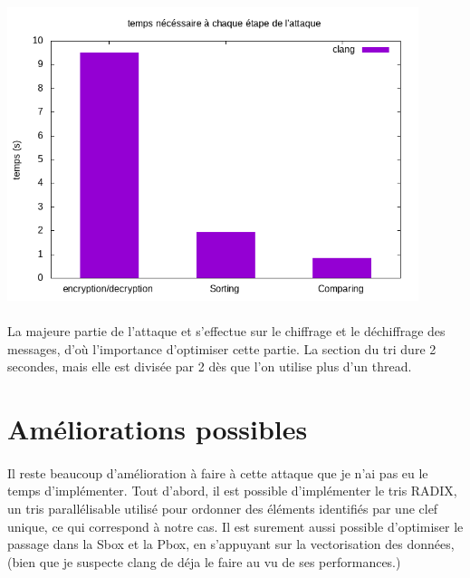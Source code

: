 \documentclass{report}
\begin{document}
\includegraphics[width=12cm]{../src/benchmarks/attack/img/parts.png}


\paragraph{} 
La majeure partie de l'attaque et s'effectue sur le chiffrage et le déchiffrage des messages, d'où l'importance d'optimiser cette partie.
La section du tri dure 2 secondes, mais elle est divisée par 2 dès que l'on utilise plus d'un thread. 

\section{ Améliorations possibles } 
\paragraph{} 
Il reste beaucoup d'amélioration à faire à cette attaque que je n'ai pas eu le temps d'implémenter. 
Tout d'abord, il est possible d'implémenter le tris RADIX, un tris parallélisable  utilisé pour ordonner des éléments identifiés par une clef unique, ce qui correspond à notre cas.
Il est surement aussi possible d'optimiser le passage dans la Sbox et la Pbox, en s'appuyant sur la vectorisation des données, 
(bien que je suspecte clang de déja le faire au vu de ses performances.)
\end{document}
